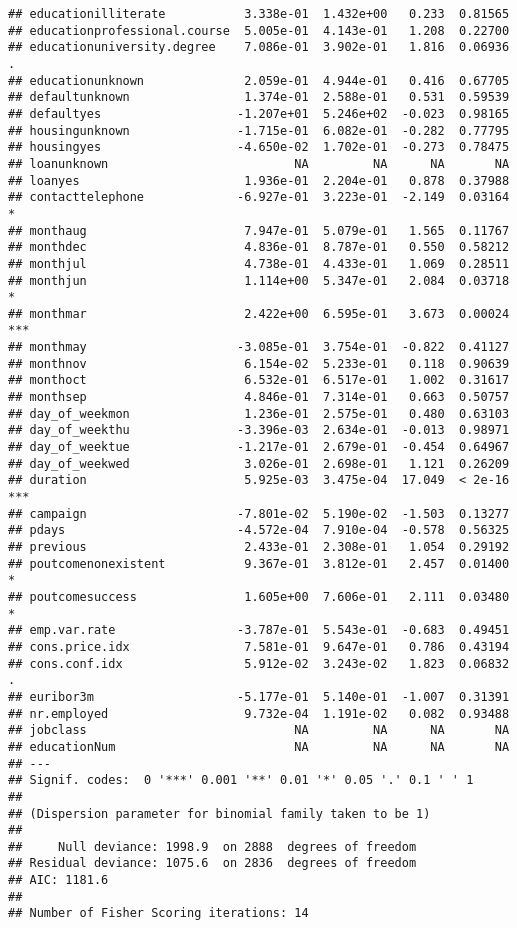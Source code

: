 \documentclass[
]{article}
\begin{document}
\begin{verbatim}
## educationilliterate           3.338e-01  1.432e+00   0.233  0.81565    
## educationprofessional.course  5.005e-01  4.143e-01   1.208  0.22700    
## educationuniversity.degree    7.086e-01  3.902e-01   1.816  0.06936 .  
## educationunknown              2.059e-01  4.944e-01   0.416  0.67705    
## defaultunknown                1.374e-01  2.588e-01   0.531  0.59539    
## defaultyes                   -1.207e+01  5.246e+02  -0.023  0.98165    
## housingunknown               -1.715e-01  6.082e-01  -0.282  0.77795    
## housingyes                   -4.650e-02  1.702e-01  -0.273  0.78475    
## loanunknown                          NA         NA      NA       NA    
## loanyes                       1.936e-01  2.204e-01   0.878  0.37988    
## contacttelephone             -6.927e-01  3.223e-01  -2.149  0.03164 *  
## monthaug                      7.947e-01  5.079e-01   1.565  0.11767    
## monthdec                      4.836e-01  8.787e-01   0.550  0.58212    
## monthjul                      4.738e-01  4.433e-01   1.069  0.28511    
## monthjun                      1.114e+00  5.347e-01   2.084  0.03718 *  
## monthmar                      2.422e+00  6.595e-01   3.673  0.00024 ***
## monthmay                     -3.085e-01  3.754e-01  -0.822  0.41127    
## monthnov                      6.154e-02  5.233e-01   0.118  0.90639    
## monthoct                      6.532e-01  6.517e-01   1.002  0.31617    
## monthsep                      4.846e-01  7.314e-01   0.663  0.50757    
## day_of_weekmon                1.236e-01  2.575e-01   0.480  0.63103    
## day_of_weekthu               -3.396e-03  2.634e-01  -0.013  0.98971    
## day_of_weektue               -1.217e-01  2.679e-01  -0.454  0.64967    
## day_of_weekwed                3.026e-01  2.698e-01   1.121  0.26209    
## duration                      5.925e-03  3.475e-04  17.049  < 2e-16 ***
## campaign                     -7.801e-02  5.190e-02  -1.503  0.13277    
## pdays                        -4.572e-04  7.910e-04  -0.578  0.56325    
## previous                      2.433e-01  2.308e-01   1.054  0.29192    
## poutcomenonexistent           9.367e-01  3.812e-01   2.457  0.01400 *  
## poutcomesuccess               1.605e+00  7.606e-01   2.111  0.03480 *  
## emp.var.rate                 -3.787e-01  5.543e-01  -0.683  0.49451    
## cons.price.idx                7.581e-01  9.647e-01   0.786  0.43194    
## cons.conf.idx                 5.912e-02  3.243e-02   1.823  0.06832 .  
## euribor3m                    -5.177e-01  5.140e-01  -1.007  0.31391    
## nr.employed                   9.732e-04  1.191e-02   0.082  0.93488    
## jobclass                             NA         NA      NA       NA    
## educationNum                         NA         NA      NA       NA    
## ---
## Signif. codes:  0 '***' 0.001 '**' 0.01 '*' 0.05 '.' 0.1 ' ' 1
## 
## (Dispersion parameter for binomial family taken to be 1)
## 
##     Null deviance: 1998.9  on 2888  degrees of freedom
## Residual deviance: 1075.6  on 2836  degrees of freedom
## AIC: 1181.6
## 
## Number of Fisher Scoring iterations: 14
\end{verbatim}
\end{document}
